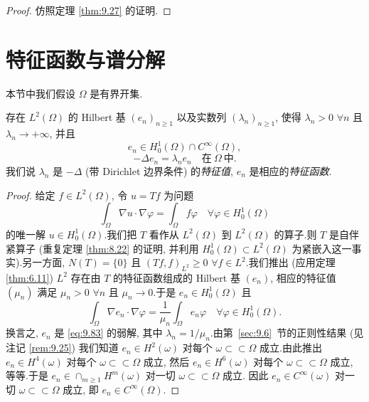 \begin{proof}
仿照定理  \ref{thm:9.27} 的证明.
\end{proof}

\section{特征函数与谱分解}
\label{sec:9.8}

本节中我们假设 $\Omega$ 是有界开集.

\begin{keytheorem}
\label{thm:9.31}
存在 $L^2(\Omega)$ 的 Hilbert 基 $(e_n)_{n\ge1}$ 以及实数列
$(\lambda_n)_{n\ge1}$, 使得 $\lambda_n>0$ $\forall n$ 且
$\lambda_n\to+\infty$, 并且
\begin{equation}
e_n\in H_0^1(\Omega)\cap C^\infty(\Omega),
\label{eq:9.82}
\end{equation}
\begin{equation}
-\Delta e_n=\lambda_ne_n\quad\text{在}\ \Omega\ \text{中}.
\label{eq:9.83}
\end{equation}
我们说 $\lambda_n$ 是 $-\Delta$ (带 Dirichlet 边界条件) 的\emph{特征值},
$e_n$ 是相应的\emph{特征函数}.
\end{keytheorem}

\begin{proof}
给定 $f\in L^2(\Omega)$, 令 $u=Tf$ 为问题
\begin{equation}
\int_\Omega\nabla u\cdot\nabla\varphi=\int_\Omega f\varphi
\quad\forall\varphi\in H_0^1(\Omega)
\label{eq:9.84}
\end{equation}
的唯一解 $u\in H_0^1(\Omega)$.我们把 $T$ 看作从 $L^2(\Omega)$ 到
$L^2(\Omega)$ 的算子.则 $T$ 是自伴紧算子 (重复定理  \ref{thm:8.22} 的证明,
并利用 $H_0^1(\Omega)\subset L^2(\Omega)$ 为紧嵌入这一事实).另一方面,
$N(T)=\{0\}$ 且 $(Tf,f)_{L^2}\ge0$ $\forall f\in L^2$.我们推出 (应用定理
 \ref{thm:6.11}) $L^2$ 存在由 $T$ 的特征函数组成的 Hilbert 基 $(e_n)$,
相应的特征值 $(\mu_n)$ 满足 $\mu_n>0$ $\forall n$ 且 $\mu_n\to0$.于是
$e_n\in H_0^1(\Omega)$ 且
\begin{equation*}
\int_\Omega\nabla e_n\cdot\nabla\varphi
=\frac1{\mu_n}\int_\Omega e_n\varphi\quad\forall\varphi\in H_0^1(\Omega).
\end{equation*}
换言之, $e_n$ 是 \eqref{eq:9.83} 的弱解, 其中 $\lambda_n=1/\mu_n$.由第~\ref{sec:9.6}~节的正则性结果 (见注记 \ref{rem:9.25}) 我们知道
$e_n\in H^2(\omega)$ 对每个 $\omega\subset\subset\Omega$ 成立.由此推出
$e_n\in H^4(\omega)$ 对每个 $\omega\subset\subset\Omega$ 成立, 然后
$e_n\in H^6(\omega)$ 对每个 $\omega\subset\subset\Omega$ 成立, 等等.于是
$e_n\in\cap_{m\ge1}H^m(\omega)$ 对一切 $\omega\subset\subset\Omega$ 成立.
因此 $e_n\in C^\infty(\omega)$ 对一切 $\omega\subset\subset\Omega$ 成立, 即
$e_n\in C^\infty(\Omega)$.
\end{proof}

